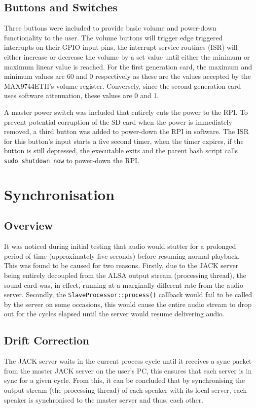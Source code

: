 \documentclass[main.tex]{subfiles}
\begin{document}
\subsection{Buttons and Switches}
Three buttons were included to provide basic volume and power-down functionality to the user. 
The volume buttons will trigger edge triggered interrupts on their GPIO input pins, the interrupt service routines (ISR) will either increase or decrease the volume by a set value until either the minimum or maximum linear value is reached.
For the first generation card, the maximum and minimum values are 60 and 0 respectively as these are the values accepted by the MAX9744ETH's volume register.
Conversely, since the second generation card uses software attenuation, these values are 0 and 1.

\medskip
A master power switch was included that entirely cuts the power to the RPI. 
To prevent potential corruption of the SD card when the power is immediately removed, a third button was added to power-down the RPI in software.
The ISR for this button's input starts a five second timer, when the timer expires, if the button is still depressed, the executable exits and the parent bash script calls \lstinline{sudo shutdown now} to power-down the RPI.


\pagebreak

\section{Synchronisation}
\subsection{Overview}
It was noticed during initial testing that audio would stutter for a prolonged period of time (approximately five seconds) before resuming normal playback.
This was found to be caused for two reasons.
Firstly, due to the JACK server being entirely decoupled from the ALSA output stream (processing thread), the sound-card was, in effect, running at a marginally different rate from the audio server.
Secondly, the \lstinline{SlaveProcessor::process()} callback would fail to be called by the server on some occasions, this would cause the entire audio stream to drop out for the cycles elapsed until the server would resume delivering audio.

\subsection{Drift Correction}
\medskip
The JACK server waits in the current process cycle until it receives a sync packet from the master JACK server on the user's PC, this ensures that each server is in sync for a given cycle.
From this, it can be concluded that by synchronising the output stream (the processing thread) of each speaker with its local server, each speaker is synchronised to the master server and thus, each other.
\end{document}
